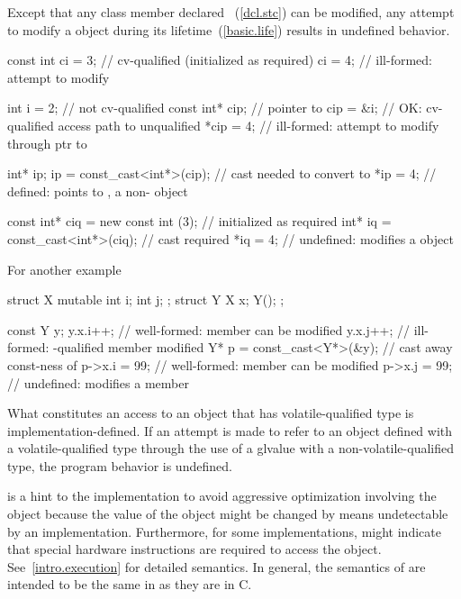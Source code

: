 \pnum
{}%
Except that any class member declared ~(\ref{dcl.stc})
can be modified, any attempt to modify a  object during its
lifetime~(\ref{basic.life}) results in undefined behavior.
\enterexample

\begin{codeblock}
const int ci = 3;               // cv-qualified (initialized as required)
ci = 4;                         // ill-formed: attempt to modify 

int i = 2;                      // not cv-qualified
const int* cip;                 // pointer to 
cip = &i;                       // OK: cv-qualified access path to unqualified
*cip = 4;                       // ill-formed: attempt to modify through ptr to 

int* ip;
ip = const_cast<int*>(cip);     // cast needed to convert  to 
*ip = 4;                        // defined:  points to , a non- object

const int* ciq = new const int (3);     // initialized as required
int* iq = const_cast<int*>(ciq);        // cast required
*iq = 4;                                // undefined: modifies a  object
\end{codeblock}

\pnum
For another example

\begin{codeblock}
struct X {
  mutable int i;
  int j;
};
struct Y {
  X x;
  Y();
};

const Y y;
y.x.i++;                        // well-formed:  member can be modified
y.x.j++;                        // ill-formed: -qualified member modified
Y* p = const_cast<Y*>(&y);      // cast away const-ness of 
p->x.i = 99;                    // well-formed:  member can be modified
p->x.j = 99;                    // undefined: modifies a  member
\end{codeblock}
\exitexample

\pnum
What constitutes an access to an object that has volatile-qualified type is
implementation-defined.
If an attempt is made to refer to an object defined with a
volatile-qualified type through the use of a glvalue with a
non-volatile-qualified type, the program behavior is undefined.

\pnum
{}%
%
\enternote
{} is a hint to the implementation to avoid aggressive
optimization involving the object because the value of the object might
be changed by means undetectable by an implementation.
Furthermore, for some implementations,  might indicate that
special hardware instructions are required to access the object.
See~\ref{intro.execution} for detailed semantics. In general, the
semantics of  are intended to be the same in \Cpp as
they are in C.
\exitnote


